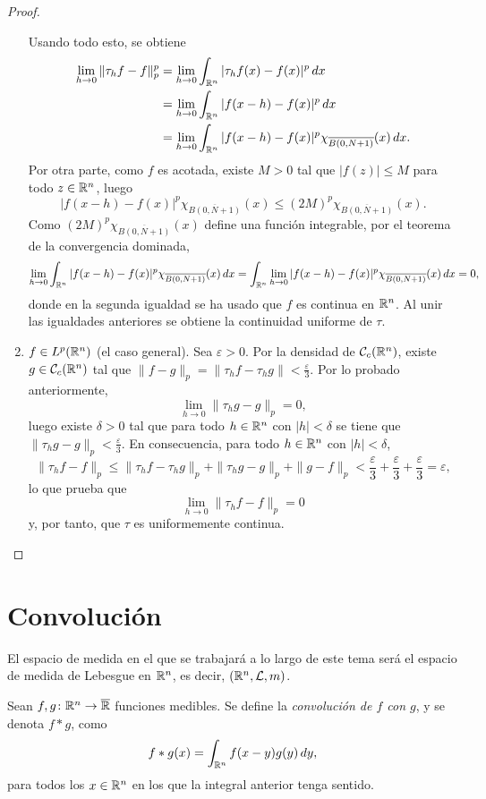 \documentclass[a4paper, 11pt, oneside]{report}
\begin{document}
\begin{proof}
\begin{enumerate}
    Usando todo esto, se obtiene
    \[
    \begin{aligned}[t]
    \lim_{h \to 0} \|\tau_hf - f\|_p^p &= \lim_{h \to 0} \int_{\mathbb R^n}|\tau_hf(x)-f(x)|^p \, dx \\
    &= \lim_{h \to 0} \int_{\mathbb R^n} |f(x-h) - f(x)|^p \, dx \\
    &= \lim_{h \to 0} \int_{\mathbb R^n} |f(x-h)-f(x)|^p \chi_{\overline{B(0,N+1)}}(x) \, dx.
    \end{aligned}
    \]
    Por otra parte, como $f$ es acotada, existe $M>0$ tal que $|f(z)| \leq M$ para todo $z \in \mathbb R^n$, luego
    \[|f(x-h)-f(x)|^p \chi_{\overline{B(0,N+1)}}(x) \leq (2M)^p \chi_{\overline{B(0,N+1)}}(x).\]
    Como $(2M)^p \chi_{\overline{B(0,N+1)}}(x)$ define una función integrable, por el teorema de la convergencia dominada,
    \[\lim_{h \to 0} \int_{\mathbb R^n} |f(x-h)-f(x)|^p \chi_{\overline{B(0,N+1)}}(x) \, dx = \int_{\mathbb R^n} \lim_{h \to 0} |f(x-h)-f(x)|^p \chi_{\overline{B(0,N+1)}}(x) \, dx = 0,\]
    donde en la segunda igualdad se ha usado que $f$ es continua en $\mathbb R^n$. Al unir las igualdades anteriores se obtiene la continuidad uniforme de $\tau$.
    \item $f \in L^p(\mathbb R^n)$ (el caso general). Sea $\varepsilon > 0$. Por la densidad de $\mathcal{C}_c(\mathbb R^n)$, existe $g \in \mathcal{C}_c(\mathbb R^n)$ tal que $\|f-g\|_p = \|\tau_hf-\tau_hg\| < \frac{\varepsilon}{3}$. Por lo probado anteriormente,
    \[\lim_{h \to 0}\|\tau_hg-g\|_p = 0,\]
    luego existe $\delta > 0$ tal que para todo $h \in \mathbb R^n$ con $|h| < \delta$ se tiene que $\|\tau_hg-g\|_p < \frac{\varepsilon}{3}$. En consecuencia, para todo $h \in \mathbb R^n$ con $|h|<\delta$,
    \[\|\tau_hf - f\|_p \leq \|\tau_hf-\tau_hg\|_p+\|\tau_hg-g\|_p+\|g-f\|_p < \frac{\varepsilon}{3}+\frac{\varepsilon}{3}+\frac{\varepsilon}{3} = \varepsilon,\]
    lo que prueba que \[\lim_{h \to 0}\|\tau_hf-f\|_p = 0\]
    y, por tanto, que $\tau$ es uniformemente continua. \qedhere
  \end{enumerate}
\end{proof}

\chapter{Convolución}

El espacio de medida en el que se trabajará a lo largo de este tema será el espacio de medida de Lebesgue en $\mathbb R^n$, es decir, $(\mathbb R^n, \mathcal{L}, m)$.

\begin{definition}
  Sean $f,g \colon \mathbb R^n \to \overline{\mathbb R}$ funciones medibles. Se define la \emph{convolución de $f$ con $g$}, y se denota $f \ast g$, como
  \[f \ast g (x)=\int_{\mathbb R^n} f(x-y)g(y) \, dy,\]
  para todos los $x \in \mathbb R^n$ en los que la integral anterior tenga sentido.
\end{definition}
\end{document}
